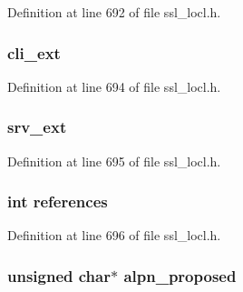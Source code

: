 Definition at line 692 of file ssl\+\_\+locl.\+h.

\subsubsection[{\texorpdfstring{cli\+\_\+ext}{cli_ext}}]{ cli\+\_\+ext}\hypertarget{structcert__st_ad1726cd75514eb359222796c5b7b1812}{}\label{structcert__st_ad1726cd75514eb359222796c5b7b1812}


Definition at line 694 of file ssl\+\_\+locl.\+h.

\subsubsection[{\texorpdfstring{srv\+\_\+ext}{srv_ext}}]{ srv\+\_\+ext}\hypertarget{structcert__st_aa5ec278e7638e9c550ee56a280adda6d}{}\label{structcert__st_aa5ec278e7638e9c550ee56a280adda6d}


Definition at line 695 of file ssl\+\_\+locl.\+h.

\subsubsection[{\texorpdfstring{references}{references}}]{\setlength{\rightskip}{0pt plus 5cm}int references}\hypertarget{structcert__st_a146fdb34d9a909e530adf8b189481195}{}\label{structcert__st_a146fdb34d9a909e530adf8b189481195}


Definition at line 696 of file ssl\+\_\+locl.\+h.

\subsubsection[{\texorpdfstring{alpn\+\_\+proposed}{alpn_proposed}}]{\setlength{\rightskip}{0pt plus 5cm}unsigned char$\ast$ alpn\+\_\+proposed}\hypertarget{structcert__st_aa873bf5399639150a667d3f9839b69f4}{}\label{structcert__st_aa873bf5399639150a667d3f9839b69f4}


